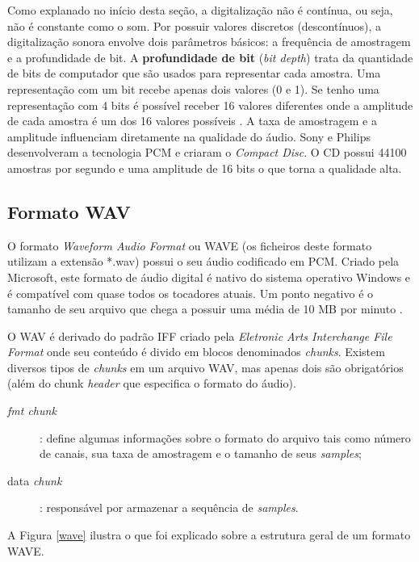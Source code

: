 Como explanado no início desta seção, a digitalização não é contínua, ou seja, não é constante como o som. Por possuir valores discretos (descontínuos), a digitalização sonora envolve dois parâmetros básicos: a frequência de amostragem e a profundidade de bit. A \textbf{profundidade de bit} (\textit{bit depth}) trata da quantidade de bits de computador que são usados para representar cada amostra. Uma representação com um bit recebe apenas dois valores (0 e 1). Se tenho uma representação com 4 bits é possível receber 16 valores diferentes onde a amplitude de cada amostra é um dos 16 valores possíveis \cite{pcm}. A taxa de amostragem e a amplitude influenciam diretamente na qualidade do áudio. Sony e Philips desenvolveram a tecnologia PCM e criaram o \textit{Compact Disc}. O CD possui 44100 amostras por segundo e uma amplitude de 16 bits o que torna a qualidade alta.


\subsection{Formato WAV}

O formato \textit{Waveform Audio Format} ou WAVE (os ficheiros deste formato utilizam a extensão *.wav) possui o seu áudio codificado em PCM. Criado pela Microsoft, este formato de áudio digital é nativo do sistema operativo Windows e é compatível com quase todos os tocadores atuais. Um ponto negativo é o tamanho de seu arquivo que chega a possuir uma média de 10 MB por minuto \cite{serraaudio}.

O WAV é derivado do padrão IFF criado pela \textit{Eletronic Arts Interchange File Format} onde seu conteúdo é divido em blocos denominados \textit{chunks}. Existem diversos tipos de \textit{chunks} em um arquivo WAV, mas apenas dois são obrigatórios (além do chunk \textit{header} que especifica o formato do áudio).

\begin{description}
	\item [\textit{fmt chunk}]: define algumas informações sobre o formato do arquivo tais como número de canais, sua taxa de amostragem e o tamanho de seus \textit{samples};
	\item [data \textit{chunk}]: responsável por armazenar a sequência de \textit{samples}.
\end{description}

A Figura \ref{wave} ilustra o que foi explicado sobre a estrutura geral de um formato WAVE.

